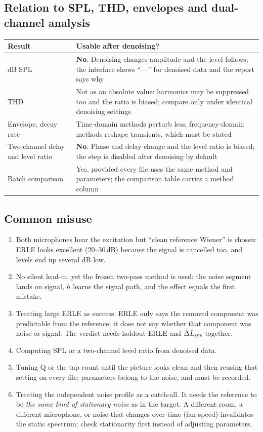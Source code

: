\documentclass[UTF8,a4paper,12pt]{ctexart}
\begin{document}
\subsection{Relation to SPL, THD, envelopes and dual-channel analysis}

\begin{longtable}{@{}p{}p{}@{}}
\toprule
Result & Usable after denoising? \\
\midrule
\endhead
dB SPL & \textbf{No}. Denoising changes amplitude and the level follows; the interface shows ``---'' for denoised data and the report says why \\
THD & Not as an absolute value: harmonics may be suppressed too and the ratio is biased; compare only under identical denoising settings \\
Envelope, decay rate & Time-domain methods perturb less; frequency-domain methods reshape transients, which must be stated \\
Two-channel delay and level ratio & \textbf{No}. Phase and delay change and the level ratio is biased; the step is disabled after denoising by default \\
Batch comparison & Yes, provided every file uses the same method and parameters; the comparison table carries a method column \\
\bottomrule
\end{longtable}

\subsection{Common misuse}

\begin{enumerate}[leftmargin=2em]
  \item Both microphones hear the excitation but ``clean reference Wiener'' is chosen: ERLE looks excellent (20--30\,dB) because the signal is cancelled too, and levels end up several dB low.
  \item No silent lead-in, yet the frozen two-pass method is used: the noise segment lands on signal, $h$ learns the signal path, and the effect equals the first mistake.
  \item Treating large ERLE as success. ERLE only says the removed component was predictable from the reference; it does not say whether that component was noise or signal. The verdict needs holdout ERLE and $\Delta L_{\rm sys}$ together.
  \item Computing SPL or a two-channel level ratio from denoised data.
  \item Tuning Q or the tap count until the picture looks clean and then reusing that setting on every file; parameters belong to the noise, and must be recorded.
  \item Treating the independent noise profile as a catch-all. It needs the reference to be \emph{the same kind of stationary noise} as in the target. A different room, a different microphone, or noise that changes over time (fan speed) invalidates the static spectrum; check stationarity first instead of adjusting parameters.
\end{enumerate}
\end{document}
